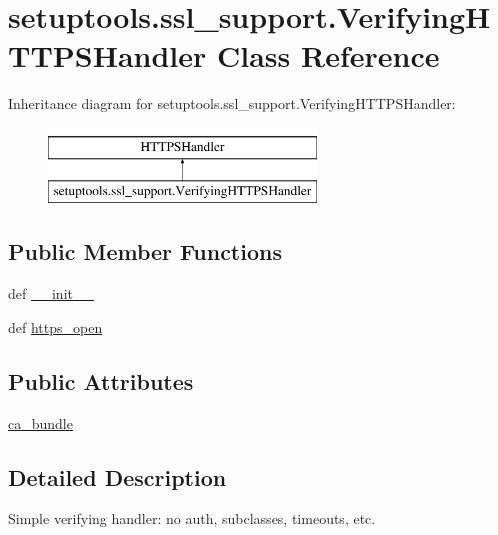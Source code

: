 \hypertarget{classsetuptools_1_1ssl__support_1_1VerifyingHTTPSHandler}{}\section{setuptools.\+ssl\+\_\+support.\+Verifying\+H\+T\+T\+P\+S\+Handler Class Reference}
\label{classsetuptools_1_1ssl__support_1_1VerifyingHTTPSHandler}
Inheritance diagram for setuptools.\+ssl\+\_\+support.\+Verifying\+H\+T\+T\+P\+S\+Handler\+:\begin{figure}[H]
\begin{center}
\leavevmode
\includegraphics[height=2.000000cm]{classsetuptools_1_1ssl__support_1_1VerifyingHTTPSHandler}
\end{center}
\end{figure}
\subsection*{Public Member Functions}
\begin{DoxyCompactItemize}
\item 
def \hyperlink{classsetuptools_1_1ssl__support_1_1VerifyingHTTPSHandler_a562d76a9ec60f2b1695989cdb5063554}{\+\_\+\+\_\+init\+\_\+\+\_\+}
\item 
def \hyperlink{classsetuptools_1_1ssl__support_1_1VerifyingHTTPSHandler_a6159cec155e01dbb0d324edad8316c02}{https\+\_\+open}
\end{DoxyCompactItemize}
\subsection*{Public Attributes}
\begin{DoxyCompactItemize}
\item 
\hyperlink{classsetuptools_1_1ssl__support_1_1VerifyingHTTPSHandler_a7b26fd0669813cfb616c35bd285a2efd}{ca\+\_\+bundle}
\end{DoxyCompactItemize}


\subsection{Detailed Description}
\begin{DoxyVerb}Simple verifying handler: no auth, subclasses, timeouts, etc.\end{DoxyVerb}
 

